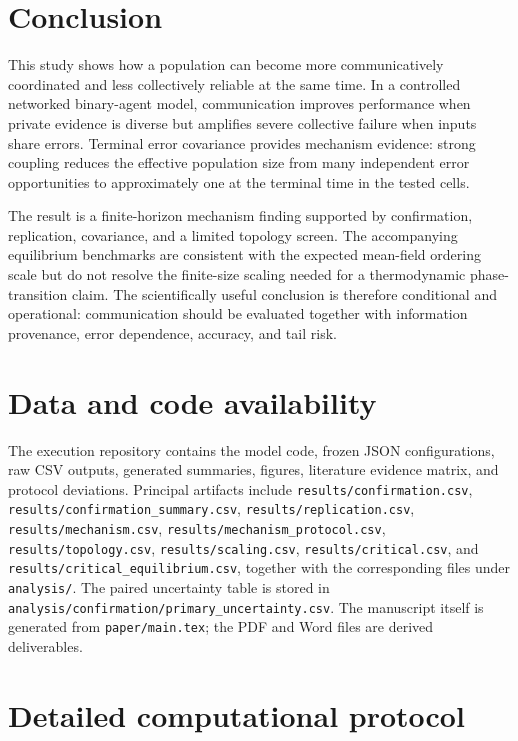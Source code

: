 \documentclass[11pt,a4paper]{article}
\begin{document}
\section{Conclusion}

This study shows how a population can become more communicatively coordinated and less collectively reliable at the same time. In a controlled networked binary-agent model, communication improves performance when private evidence is diverse but amplifies severe collective failure when inputs share errors. Terminal error covariance provides mechanism evidence: strong coupling reduces the effective population size from many independent error opportunities to approximately one at the terminal time in the tested cells.

The result is a finite-horizon mechanism finding supported by confirmation, replication, covariance, and a limited topology screen. The accompanying equilibrium benchmarks are consistent with the expected mean-field ordering scale but do not resolve the finite-size scaling needed for a thermodynamic phase-transition claim. The scientifically useful conclusion is therefore conditional and operational: communication should be evaluated together with information provenance, error dependence, accuracy, and tail risk.

\section{Data and code availability}

The execution repository contains the model code, frozen JSON configurations, raw CSV outputs, generated summaries, figures, literature evidence matrix, and protocol deviations. Principal artifacts include \texttt{results/confirmation.csv}, \texttt{results/confirmation\_summary.csv}, \texttt{results/replication.csv}, \texttt{results/mechanism.csv}, \texttt{results/mechanism\_protocol.csv}, \texttt{results/topology.csv}, \texttt{results/scaling.csv}, \texttt{results/critical.csv}, and \texttt{results/critical\_equilibrium.csv}, together with the corresponding files under \texttt{analysis/}. The paired uncertainty table is stored in \texttt{analysis/confirmation/primary\_uncertainty.csv}. The manuscript itself is generated from \texttt{paper/main.tex}; the PDF and Word files are derived deliverables.

\appendix

\section{Detailed computational protocol}
\end{document}
